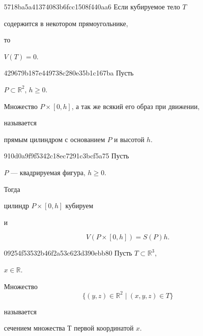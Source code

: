 \begin{note}{5718ba5a41374083b6fcc1508f440aa6}
    Если кубируемое тело \({ T }\) \begin{icloze}{2}содержится в некотором прямоугольнике,\end{icloze} то \begin{icloze}{1}\({ V(T) = 0 }\).\end{icloze}
\end{note}

\begin{note}{429679b187e449738c280e35b1c167ba}
    Пусть \begin{icloze}{3}\({ P \subset \mathbb R^2 }\), \({ h \geqslant 0 }\).\end{icloze}
    \begin{icloze}{1}Множество \({ P \times [0, h] }\), а так же всякий его образ при движении,\end{icloze} называется \begin{icloze}{2}прямым цилиндром с основанием \({ P }\) и высотой \({ h }\).\end{icloze}
\end{note}

\begin{note}{910d0a9f9f5342c18ec7291c3bcf5a75}
    Пусть \begin{icloze}{3}\({ P }\) --- квадрируемая фигура, \({ h \geqslant 0 }\).\end{icloze}
    Тогда \begin{icloze}{1}цилиндр \({ P  \times [0, h] }\) кубируем\end{icloze} и
    \begin{icloze}{2}
        \[
            V(P \times [0, h]) = S(P)h.
        \]
    \end{icloze}
\end{note}

\begin{note}{09254f53532b46f2a53c623d390ebb80}
    Пусть \({ T \subset \mathbb R^3 }\), \begin{icloze}{3}\({ x \in \mathbb R }\).\end{icloze}
    \begin{icloze}{1}
        Множество
        \[
            \Big\{ (y, z) \in \mathbb R^2 \mid (x, y, z) \in T \Big\}
        \]
    \end{icloze}
    называется \begin{icloze}{2}сечением множества \({ Т }\) первой координатой \({ x }\).\end{icloze}
\end{note}

